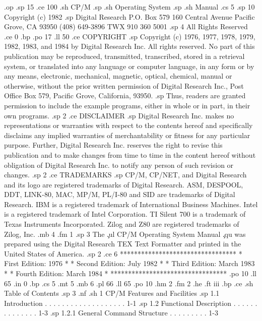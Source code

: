 .op
.sp 15
.ce 100
.sh
CP/M
.sp
.sh
Operating System
.sp
.sh
Manual
.cs 5
.sp 10
Copyright (c) 1982
.sp
Digital Research
P.O. Box 579
160 Central Avenue
Pacific Grove, CA 93950
(408) 649-3896
TWX 910 360 5001
.sp 4
All Rights Reserved
.ce 0
.bp
.po 17
.ll 50
.ce
COPYRIGHT
.sp
Copyright (c) 1976, 1977, 1978, 1979, 1982, 1983, and 1984 by 
Digital Research Inc.  All rights reserved.  No part of this 
publication may be reproduced, transmitted, transcribed, stored 
in a retrieval system, or translated into any language or 
computer language, in any form or by any means, electronic, mechanical,
magnetic, optical, chemical, manual or otherwise, without the prior
written permission of Digital Research Inc., Post Office Box 579, 
Pacific Grove, California, 93950.
.sp
Thus, readers are granted permission to include the example 
programs, either in whole or in part, in their own programs.
.sp 2
.ce
DISCLAIMER
.sp
Digital Research Inc. makes no representations or warranties with
respect to the contents hereof and specifically disclaims
any implied warranties of merchantability or fitness for
any particular purpose.  Further, Digital Research Inc. reserves the
right to revise this publication and to make changes from
time to time in the content hereof without obligation of
Digital Research Inc. to notify any person of such revision or
changes.
.sp 2
.ce
TRADEMARKS
.sp
CP/M, CP/NET, and Digital Research and its logo are registered 
trademarks of Digital Research.  ASM, DESPOOL, DDT, LINK-80, MAC, 
MP/M, PL/I-80 and SID are trademarks of Digital Research.  IBM is 
a registered trademark of International Business Machines.  Intel 
is a registered trademark of Intel Corporation.  TI Silent 700 is 
a trademark of Texas Instruments Incorporated.  Zilog and Z80 are
registered trademarks of Zilog, Inc.
.mb 4
.fm 1
.sp 3
The \c
.ul
CP/M Operating System Manual \c
.qu
was prepared using the Digital Research TEX Text Formatter and printed
in the United States of America.
.sp 2
.ce 6
*********************************
*   First Edition:  1976        *
*  Second Edition:  July 1982   *
*   Third Edition:  March 1983  *
*  Fourth Edition:  March 1984  *
*********************************
.po 10
.ll 65
.in 0
.bp
.cs 5
.mt 5
.mb 6
.pl 66
.ll 65
.po 10
.hm 2
.fm 2
.he
.ft                                iii
.bp
.ce
.sh
Table of Contents
.sp 3
.nf
.sh
1  CP/M Features and Facilities
.sp
   1.1  Introduction  . . . . . . . . . . . . . . . . . . .   1-1
.sp
   1.2  Functional Description  . . . . . . . . . . . . . .   1-3
.sp
        1.2.1  General Command Structure  . . . . . . . . .   1-3
